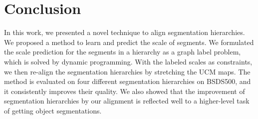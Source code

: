 

\section{Conclusion}
\label{scale:sec:conclusions}
In this work, we presented a novel technique to align segmentation
hierarchies. We proposed a method to learn and predict the scale of
segments. We formulated the scale prediction for the segments in
a hierarchy as a graph label problem, which is solved by dynamic
programming. With the labeled scales as constraints, we then re-align
the segmentation hierarchies by stretching the UCM maps. The method
is evaluated on four different segmentation hierarchies on BSDS500, and it
consistently improves their quality.  We also showed
that the improvement of segmentation hierarchies by our alignment is
reflected well to a higher-level task of getting object segmentations.

%
%
%
%

